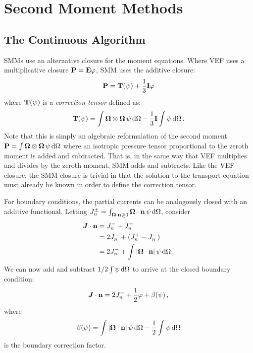 \documentclass[../doc.tex]{subfiles}
\begin{document}
\chapter{Second Moment Methods}

\section{The Continuous Algorithm}
SMMs use an alternative closure for the moment equations. Where VEF uses a multiplicative closure $\boldsymbol{\mathrm{P}} = \boldsymbol{\mathrm{E}}\varphi$, SMM uses the additive closure: 
	\begin{equation}
		\boldsymbol{\mathrm{P}} = \boldsymbol{\mathrm{T}}(\psi) + \frac{1}{3}\boldsymbol{\mathrm{I}} \varphi 
	\end{equation}
where $\boldsymbol{\mathrm{T}}(\psi)$ is a \emph{correction tensor} defined as: 
	\begin{equation}
		\boldsymbol{\mathrm{T}}(\psi) = \int \boldsymbol{\Omega}\otimes\boldsymbol{\Omega}\, \psi \mathop{}\!\mathrm{d} \Omega - \frac{1}{3}\boldsymbol{\mathrm{I}}\int \psi \mathop{}\!\mathrm{d} \Omega \,. 
	\end{equation}
Note that this is simply an algebraic reformulation of the second moment $\boldsymbol{\mathrm{P}} = \int \boldsymbol{\Omega}\otimes\boldsymbol{\Omega}\, \psi \mathop{}\!\mathrm{d} \Omega$ where an isotropic pressure tensor proportional to the zeroth moment is added and subtracted. That is, in the same way that VEF multiplies and divides by the zeroth moment, SMM adds and subtracts. 
Like the VEF closure, the SMM closure is trivial in that the solution to the transport equation must already be known in order to define the correction tensor. 

For boundary conditions, the partial currents can be analogously closed with an additive functional. Letting $J_n^\pm = \int_{\boldsymbol{\Omega}\cdot\boldsymbol{\mathrm{n}}\gtrless0} \boldsymbol{\Omega}\cdot\boldsymbol{\mathrm{n}}\, \psi \mathop{}\!\mathrm{d} \Omega$, consider 
	\begin{equation}
	\begin{aligned}
		\boldsymbol{J}\cdot\boldsymbol{\mathrm{n}} &= J_n^- + J_n^+ \\
		&= 2J_n^- + (J_n^+ - J_n^-) \\
		&= 2J_n^- + \int |\boldsymbol{\Omega}\cdot\boldsymbol{\mathrm{n}}|\,\psi \mathop{}\!\mathrm{d} \Omega \,. 
	\end{aligned}
	\end{equation}
We can now add and subtract $1/2 \int \psi \mathop{}\!\mathrm{d} \Omega$ to arrive at the closed boundary condition: 
	\begin{equation}
		\boldsymbol{J}\cdot\boldsymbol{\mathrm{n}} = 2J_n^- + \frac{1}{2}\varphi + \beta(\psi) \,, 
	\end{equation}
where 
	\begin{equation}
		\beta(\psi) = \int |\boldsymbol{\Omega}\cdot\boldsymbol{\mathrm{n}}|\,\psi \mathop{}\!\mathrm{d} \Omega - \frac{1}{2}\int\psi \mathop{}\!\mathrm{d} \Omega 
	\end{equation}
is the boundary correction factor. 
\end{document}
